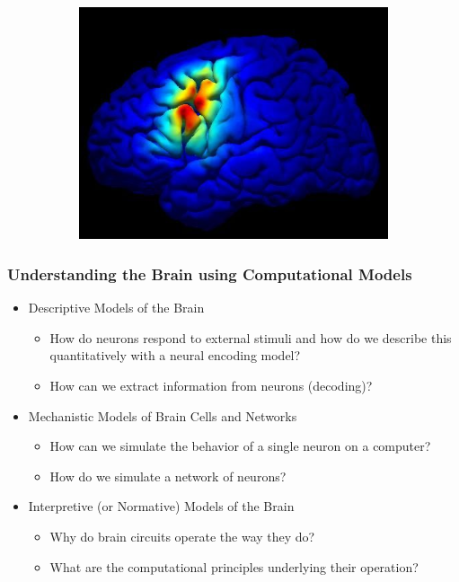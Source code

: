 \documentclass[]{article}
\begin{document}
\begin{figure}[H]
\begin{subfigure}[t]{0.45\textwidth}
		\includegraphics[width=\textwidth]{universe2}
	\end{subfigure}
\end{figure}
\subsubsection{Understanding the Brain using Computational Models}
\begin{itemize}
	\item Descriptive Models of the Brain
	\begin{itemize}
		\item How do neurons respond to external stimuli and how do we
		describe this quantitatively with a neural encoding model?
		\item How can we extract information from neurons (decoding)?
	\end{itemize}
    \item Mechanistic Models of Brain Cells and Networks
	\begin{itemize}
		\item     How can we simulate the behavior of a single neuron on a
	    computer?
	    \item How do we simulate a network of neurons?
	\end{itemize}
	\item  Interpretive (or Normative) Models of the Brain
	\begin{itemize}
		\item 	Why do brain circuits operate the way they do?
		\item What are the computational principles underlying their
		operation?
	\end{itemize}
\end{itemize}
\end{document}

